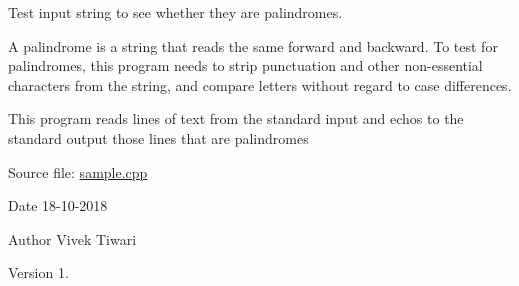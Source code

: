 Test input string to see whether they are palindromes.

A palindrome is a string that reads the same forward and backward. To test for palindromes, this program needs to strip punctuation and other non-\/essential characters from the string, and compare letters without regard to case differences.

This program reads lines of text from the standard input and echos to the standard output those lines that are palindromes

Source file\+: \hyperlink{sample_8cpp}{sample.\+cpp }

\begin{DoxyDate}{Date}
18-\/10-\/2018 
\end{DoxyDate}
\begin{DoxyAuthor}{Author}
Vivek Tiwari 
\end{DoxyAuthor}
\begin{DoxyVersion}{Version}
1. 
\end{DoxyVersion}
